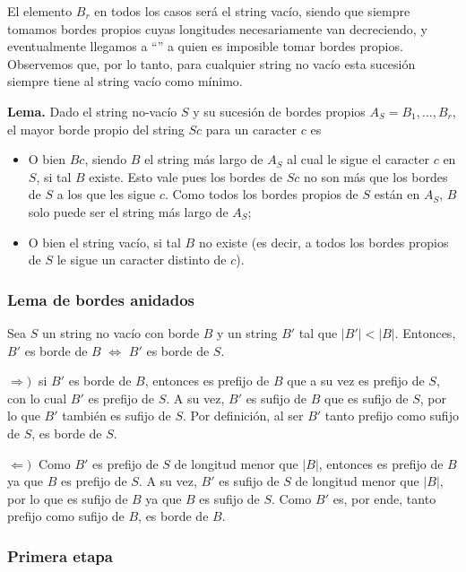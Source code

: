 El elemento $B_r$ en todos los casos será el string vacío, siendo que siempre tomamos bordes propios cuyas longitudes necesariamente van decreciendo, y eventualmente llegamos a ``'' a quien es imposible tomar bordes propios. Observemos que, por lo tanto, para cualquier string no vacío esta sucesión siempre tiene al string vacío como mínimo.

\medskip

\textbf{Lema.} Dado el string no-vacío $S$ y su sucesión de bordes propios $A_S = B_1, \dots, B_r$, el mayor borde propio del string $Sc$ para un caracter $c$ es

\begin{itemize}
\setlength\itemsep{0em}
\item O bien $Bc$, siendo $B$ el string más largo de $A_S$ al cual le sigue el caracter $c$ en $S$, si tal $B$ existe.
	Esto vale pues los bordes de $Sc$ no son más que los bordes de $S$ a los que les sigue $c$.
	Como todos los bordes propios de $S$ están en $A_S$, $B$ solo puede ser el string más largo de $A_S$;
\item O bien el string vacío, si tal $B$ no existe (es decir, a todos los bordes propios de $S$ le sigue un caracter distinto de $c$).
\end{itemize}

\subsubsection{Lema de bordes anidados}

Sea $S$ un string no vacío con borde $B$ y un string $B'$ tal que $|B'| < |B|$. Entonces, $B'$ es borde de $B$ $\iff$ $B'$ es borde de $S$.

\medskip

$\Longrightarrow) \ $ si $B'$ es borde de $B$, entonces es prefijo de $B$ que a su vez es prefijo de $S$, con lo cual $B'$ es prefijo de $S$. A su vez, $B'$ es sufijo de $B$ que es sufijo de $S$, por lo que $B'$ también es sufijo de $S$. Por definición, al ser $B'$ tanto prefijo como sufijo de $S$, es borde de $S$.

$\Longleftarrow) \ $ Como $B'$ es prefijo de $S$ de longitud menor que $|B|$, entonces es prefijo de $B$ ya que $B$ es prefijo de $S$. A su vez, $B'$ es sufijo de $S$ de longitud menor que $|B|$, por lo que es sufijo de $B$ ya que $B$ es sufijo de $S$. Como $B'$ es, por ende, tanto prefijo como sufijo de $B$, es borde de $B$.

\subsubsection{Primera etapa}

